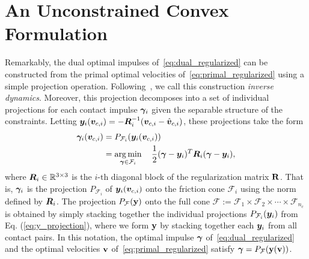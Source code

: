 \section{An Unconstrained Convex Formulation}
\label{sec:unconstrained_convex_formulation}
Remarkably,  the dual optimal impulses of~\eqref{eq:dual_regularized} can be
constructed from the primal optimal velocities of~\eqref{eq:primal_regularized}
using a simple projection operation. Following~\cite{bib:todorov2014}, we call
this construction  \textit{inverse dynamics}. Moreover, this projection
decomposes into a set of individual projections for each contact impulse
${\bm\gamma}_i$ given the separable structure of the constraints. Letting
${\bm{y}}_i({\bm{v}}_{c,i}) = -{\bm{R}}_i^{-1}({\bm{v}}_{c,i}-\hat{{\bm{v}}}_{c,i})$,
these projections take the form
\begin{equation}
  \begin{aligned}
	\bgamma_i(\vf{v}_{c,i})&= P_{\mathcal{F}_i}(\vf{y}_i(\vf{v}_{c,i}))\\
	&= \argmin_{\bgamma\in\mathcal{F}_i} \quad 
		\frac{1}{2}(\bgamma-\vf{y}_i)^T\vf{R}_i(\bgamma-\vf{y}_i),\\
	\end{aligned}
	\label{eq:y_projection}
\end{equation}
where ${\bm{R}}_i\in\mathbb{R}^{3\times3}$ is the $i\text{-th}$ diagonal block of
the regularization matrix ${\mathbf{R}}$. That is, ${\bm\gamma}_i$ is the projection
$P_{\mathcal{F}_i}$ of ${\bm{y}}_i({\bm{v}}_{c,i})$ onto the friction cone
$\mathcal{F}_i$ using the norm defined by ${\bm{R}}_i$. The projection
$P_{\mathcal{F}}({\mathbf{y}})$ onto the full cone $\mathcal{F} := \mathcal{F}_1
\times \mathcal{F}_2 \times \cdots \times \mathcal{F}_{n_c}$ is obtained by simply
stacking together the individual projections $P_{\mathcal{F}_i}({\bm{y}}_i)$ from
Eq. (\ref{eq:y_projection}), where we form ${\mathbf{y}}$ by stacking together each
${\bm{y}}_i$ from all contact pairs.  In this notation, the optimal impulse
${\bm\gamma}$ of~\eqref{eq:dual_regularized} and the optimal velocities ${\mathbf{v}}$
of~\eqref{eq:primal_regularized} satisfy  ${\bm\gamma} =
P_{\mathcal{F}}({\mathbf{y}}({\mathbf{v}}))$.

